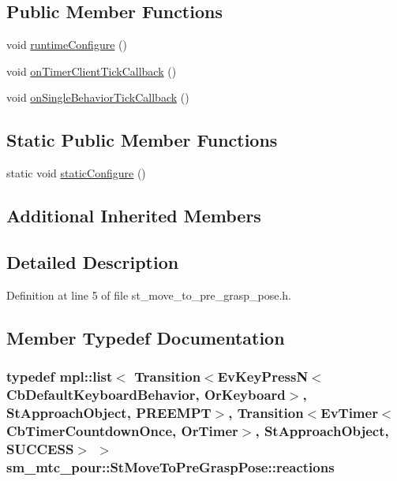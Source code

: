 \subsection*{Public Member Functions}
\begin{DoxyCompactItemize}
\item 
void \hyperlink{structsm__mtc__pour_1_1StMoveToPreGraspPose_a3dc168d576c7f926a0671049c7696fad}{runtime\+Configure} ()
\item 
void \hyperlink{structsm__mtc__pour_1_1StMoveToPreGraspPose_abe0e16626747bc05e3814c81c1815eca}{on\+Timer\+Client\+Tick\+Callback} ()
\item 
void \hyperlink{structsm__mtc__pour_1_1StMoveToPreGraspPose_a33e9a479c13d55f0139bcf6a085282f1}{on\+Single\+Behavior\+Tick\+Callback} ()
\end{DoxyCompactItemize}
\subsection*{Static Public Member Functions}
\begin{DoxyCompactItemize}
\item 
static void \hyperlink{structsm__mtc__pour_1_1StMoveToPreGraspPose_a2dff261e3bb761d7bcf5410fc4a1a673}{static\+Configure} ()
\end{DoxyCompactItemize}
\subsection*{Additional Inherited Members}


\subsection{Detailed Description}


Definition at line 5 of file st\+\_\+move\+\_\+to\+\_\+pre\+\_\+grasp\+\_\+pose.\+h.



\subsection{Member Typedef Documentation}
\subsubsection[{\texorpdfstring{reactions}{reactions}}]{\setlength{\rightskip}{0pt plus 5cm}typedef mpl\+::list$<$ Transition$<$Ev\+Key\+PressN$<$Cb\+Default\+Keyboard\+Behavior, {\bf Or\+Keyboard}$>$, {\bf St\+Approach\+Object}, {\bf P\+R\+E\+E\+M\+PT}$>$, Transition$<$Ev\+Timer$<$Cb\+Timer\+Countdown\+Once, {\bf Or\+Timer}$>$, {\bf St\+Approach\+Object}, {\bf S\+U\+C\+C\+E\+SS}$>$ $>$ {\bf sm\+\_\+mtc\+\_\+pour\+::\+St\+Move\+To\+Pre\+Grasp\+Pose\+::reactions}}\hypertarget{structsm__mtc__pour_1_1StMoveToPreGraspPose_a0bf563260ac3d6ece8442e792bd062da}{}\label{structsm__mtc__pour_1_1StMoveToPreGraspPose_a0bf563260ac3d6ece8442e792bd062da}


